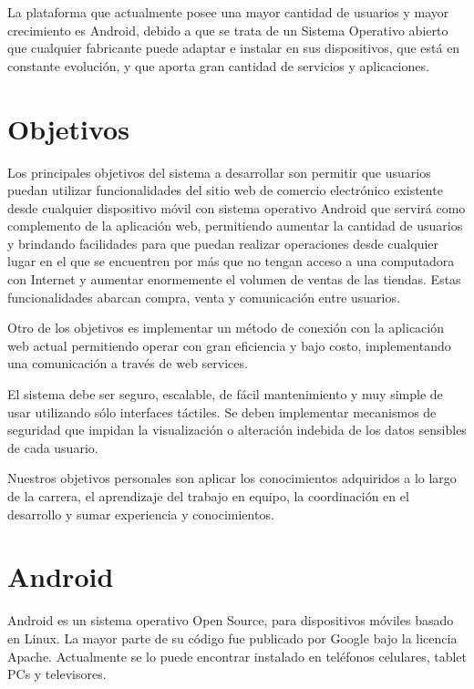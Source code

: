 La plataforma que actualmente posee una mayor cantidad de usuarios y mayor crecimiento es Android, debido a que se trata de un Sistema Operativo abierto que cualquier fabricante puede adaptar e instalar en sus dispositivos, que está en constante evolución, y que aporta gran cantidad de servicios y aplicaciones. 

\section{Objetivos}

Los principales objetivos del sistema a desarrollar son permitir que usuarios puedan
utilizar funcionalidades del sitio web de comercio electrónico existente desde cualquier dispositivo móvil con sistema operativo Android que servirá como complemento de la aplicación web, permitiendo
aumentar la cantidad de usuarios y brindando facilidades para que puedan realizar operaciones desde cualquier lugar en el que se encuentren por más que no tengan acceso a una computadora con Internet y aumentar enormemente el volumen de ventas de las tiendas.
Estas funcionalidades abarcan compra, venta y comunicación entre usuarios.

Otro de los objetivos es implementar un método de conexión con la aplicación web
actual permitiendo operar con gran eficiencia y bajo costo, implementando una comunicación a través de web services.

El sistema debe ser seguro, escalable, de fácil mantenimiento y muy simple de usar
utilizando sólo interfaces táctiles. Se deben implementar mecanismos de seguridad que impidan la visualización o alteración indebida de los datos sensibles de cada usuario.

Nuestros objetivos personales son aplicar los conocimientos adquiridos a lo largo de la carrera, el aprendizaje del trabajo en equipo, la coordinación en el desarrollo y sumar experiencia y conocimientos.


\section{Android}
Android es un sistema operativo Open Source, para dispositivos móviles basado en Linux. La mayor parte de su código fue publicado por Google bajo la licencia Apache. Actualmente se lo puede encontrar instalado en teléfonos celulares, tablet PCs y televisores.


